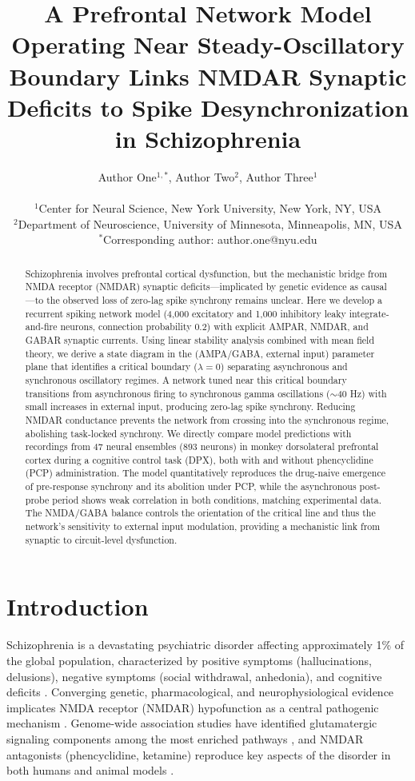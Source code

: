 \documentclass[11pt]{article}
\title{A Prefrontal Network Model Operating Near Steady-Oscillatory Boundary Links NMDAR Synaptic Deficits to Spike Desynchronization in Schizophrenia}
\author{
Author One$^{1,*}$, Author Two$^{2}$, Author Three$^{1}$ \\
\\
$^{1}$Center for Neural Science, New York University, New York, NY, USA \\
$^{2}$Department of Neuroscience, University of Minnesota, Minneapolis, MN, USA \\
$^{*}$Corresponding author: author.one@nyu.edu
}
\date{}
\begin{document}
\maketitle

\begin{abstract}
Schizophrenia involves prefrontal cortical dysfunction, but the mechanistic bridge from NMDA receptor (NMDAR) synaptic deficits---implicated by genetic evidence as causal---to the observed loss of zero-lag spike synchrony remains unclear. Here we develop a recurrent spiking network model (4,000 excitatory and 1,000 inhibitory leaky integrate-and-fire neurons, connection probability 0.2) with explicit AMPAR, NMDAR, and GABAR synaptic currents. Using linear stability analysis combined with mean field theory, we derive a state diagram in the (AMPA/GABA, external input) parameter plane that identifies a critical boundary ($\lambda = 0$) separating asynchronous and synchronous oscillatory regimes. A network tuned near this critical boundary transitions from asynchronous firing to synchronous gamma oscillations ($\sim$40 Hz) with small increases in external input, producing zero-lag spike synchrony. Reducing NMDAR conductance prevents the network from crossing into the synchronous regime, abolishing task-locked synchrony. We directly compare model predictions with recordings from 47 neural ensembles (893 neurons) in monkey dorsolateral prefrontal cortex during a cognitive control task (DPX), both with and without phencyclidine (PCP) administration. The model quantitatively reproduces the drug-naive emergence of pre-response synchrony and its abolition under PCP, while the asynchronous post-probe period shows weak correlation in both conditions, matching experimental data. The NMDA/GABA balance controls the orientation of the critical line and thus the network's sensitivity to external input modulation, providing a mechanistic link from synaptic to circuit-level dysfunction.
\end{abstract}

\section{Introduction}

Schizophrenia is a devastating psychiatric disorder affecting approximately 1\% of the global population, characterized by positive symptoms (hallucinations, delusions), negative symptoms (social withdrawal, anhedonia), and cognitive deficits \citep{ripke2014}. Converging genetic, pharmacological, and neurophysiological evidence implicates NMDA receptor (NMDAR) hypofunction as a central pathogenic mechanism \citep{javitt2012, olney1999, krystal1994}. Genome-wide association studies have identified glutamatergic signaling components among the most enriched pathways \citep{ripke2014}, and NMDAR antagonists (phencyclidine, ketamine) reproduce key aspects of the disorder in both humans and animal models \citep{krystal1994}.
\end{document}
